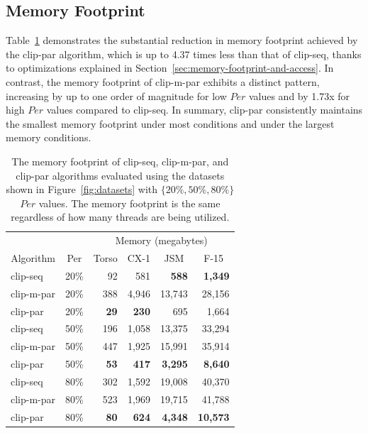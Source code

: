 \documentclass{egpubl}
\begin{document}
\subsection{Memory Footprint}

Table~\ref{tab:mem-footprint} demonstrates the substantial reduction in memory footprint achieved by the clip-par algorithm, which is up to 4.37 times less than that of clip-seq, thanks to optimizations explained in Section~\ref{sec:memory-footprint-and-access}. In contrast, the memory footprint of clip-m-par exhibits a distinct pattern, increasing by up to one order of magnitude for low $Per$ values and by 1.73x for high $Per$ values compared to clip-seq. In summary, clip-par consistently maintains the smallest memory footprint under most conditions and under the largest memory conditions.

\begin{table}[h]
\centering
\caption{The memory footprint of clip-seq, clip-m-par, and clip-par algorithms evaluated using the datasets shown in Figure~\ref{fig:datasets} with  $\{20\%, 50\%, 80\%\}$ $Per$ values. The memory footprint is the same regardless of how many threads are being utilized. }
\label{tab:mem-footprint}
\begin{tabular}{lc@{\quad}rrrr}
\toprule
\multicolumn{2}{l}{}                & \multicolumn{4}{c}{Memory (megabytes)}                                                                    \\
\multicolumn{1}{c}{Algorithm} & Per & \multicolumn{1}{c}{Torso} & \multicolumn{1}{c}{CX-1} & \multicolumn{1}{c}{JSM} & \multicolumn{1}{c}{F-15} \\
\midrule
clip-seq   & 20\% & 92        & 581        &\textbf{588}  &\textbf{1,349} \\
clip-m-par & 20\% & 388       & 4,946      & 13,743       & 28,156        \\
clip-par   & 20\% &\textbf{29}&\textbf{230}& 695          & 1,664         \\[1ex]
clip-seq   & 50\% & 196       & 1,058      & 13,375       & 33,294        \\
clip-m-par & 50\% & 447       & 1,925      & 15,991       & 35,914        \\
clip-par   & 50\% &\textbf{53}&\textbf{417}&\textbf{3,295}&\textbf{8,640} \\[1ex]
clip-seq   & 80\% & 302       & 1,592      & 19,008       & 40,370        \\
clip-m-par & 80\% & 523       & 1,969      & 19,715       & 41,788        \\
clip-par   & 80\% &\textbf{80}&\textbf{624}&\textbf{4,348}&\textbf{10,573}\\
\bottomrule
\end{tabular}
\end{table}
\end{document}
